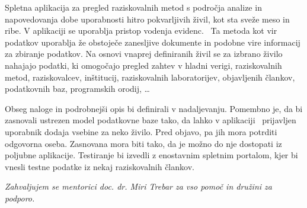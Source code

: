 \documentclass[a4paper, 12pt]{book}
\newcommand{\clearemptydoublepage}{\newpage{\pagestyle{empty}\cleardoublepage}}
\begin{document}
Spletna aplikacija za pregled raziskovalnih metod s področja analize in napovedovanja dobe uporabnosti hitro pokvarljivih živil, kot sta sveže meso in ribe. V aplikaciji se uporablja pristop vodenja evidenc.  Ta metoda kot vir podatkov uporablja že obstoječe zanesljive dokumente in podobne vire informacij za zbiranje podatkov. Na osnovi vnaprej definiranih živil se za izbrano živilo nahajajo podatki, ki omogočajo pregled zahtev v hladni verigi, raziskovalnih metod, raziskovalcev, inštitucij, raziskovalnih laboratorijev, objavljenih člankov, podatkovnih baz, programskih orodij, …

Obseg naloge in podrobnejši opis bi definirali v nadaljevanju. Pomembno je, da bi zasnovali ustrezen
model podatkovne baze tako, da lahko v aplikaciji  prijavljen uporabnik dodaja vsebine za neko živilo.
Pred objavo, pa jih mora potrditi odgovorna oseba. Zasnovana mora biti tako, da je možno do nje
dostopati iz poljubne aplikacije. Testiranje bi izvedli z enostavnim spletnim portalom, kjer bi vnesli
testne podatke iz nekaj raziskovalnih člankov.

\vspace{15mm}






\vspace{2cm}

\clearemptydoublepage

\thispagestyle{empty}\mbox{}\vfill\null\it%
\noindent
Zahvaljujem se mentorici doc. dr. Miri Trebar za vso pomoč in družini za podporo.
\rm\normalfont

\clearemptydoublepage


\pagestyle{empty}
\def\thepage{}%
\tableofcontents{}


\let\cleardoublepage=\clearpage

\end{document}
